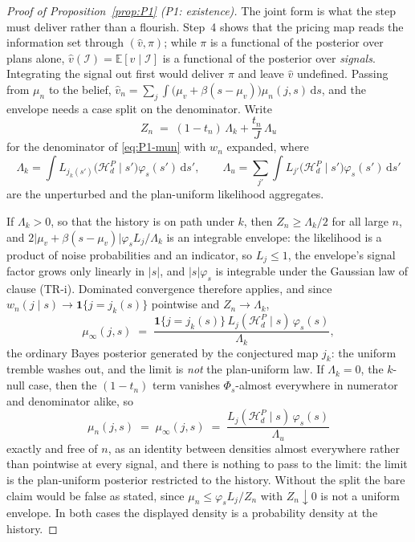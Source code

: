 \documentclass[11pt]{article}
\newcommand{\Eop}{\mathbb{E}}
\newcommand{\ind}{\mathbf{1}}
\begin{document}
\begin{proof}[Proof of Proposition~\ref{prop:P1} (P1: existence)]
The joint form is what the step must deliver rather than a flourish. Step~4 shows that the pricing
map reads the information set through $(\hat v,\pi)$; while $\pi$ is a functional of the posterior
over plans alone, $\hat v(\mathcal I) = \Eop[v \mid \mathcal I]$ is a functional of the posterior over
\emph{signals}. Integrating the signal out first would deliver $\pi$ and leave $\hat v$ undefined.
Passing from $\mu_n$ to the belief, $\hat v_n = \sum_j \int \bigl(\mu_v+\beta(s-\mu_v)\bigr)
\mu_n(j,s)\,\mathrm{d}s$, and the envelope needs a case split on the denominator. Write
\begin{equation}
\label{eq:P1-Zn}
Z_n \;=\; (1-t_n)\,\Lambda_k + \frac{t_n}{J}\,\Lambda_u
\end{equation}
for the denominator of \eqref{eq:P1-mun} with $w_n$ expanded, where
\[
\Lambda_k = \int L_{j_k(s')}\bigl(\mathcal H_d^P \mid s'\bigr)\varphi_s(s')\,\mathrm{d}s',
\qquad
\Lambda_u = \sum_{j'} \int L_{j'}\bigl(\mathcal H_d^P \mid s'\bigr)\varphi_s(s')\,\mathrm{d}s'
\]
are the unperturbed and the plan-uniform likelihood aggregates.

If $\Lambda_k > 0$, so that the history is on path under $k$, then $Z_n \ge \Lambda_k/2$ for all
large $n$, and $2\lvert \mu_v+\beta(s-\mu_v)\rvert\varphi_s L_j/\Lambda_k$ is an integrable envelope:
the likelihood is a product of noise probabilities and an indicator, so $L_j \le 1$, the envelope's
signal factor grows only linearly in $\lvert s\rvert$, and $\lvert s\rvert\varphi_s$ is integrable
under the Gaussian law of clause (TR-i). Dominated convergence therefore applies, and since
$w_n(j \mid s) \to \ind\{j = j_k(s)\}$ pointwise and $Z_n \to \Lambda_k$,
\[
\mu_\infty(j,s) \;=\; \frac{\ind\{j = j_k(s)\}\,L_j(\mathcal H_d^P \mid s)\,\varphi_s(s)}{\Lambda_k},
\]
the ordinary Bayes posterior generated by the conjectured map $j_k$: the uniform tremble washes out,
and the limit is \emph{not} the plan-uniform law. If $\Lambda_k = 0$, the $k$-null case, then the
$(1-t_n)$ term vanishes $\Phi_s$-almost everywhere in numerator and denominator alike, so
\[
\mu_n(j,s) \;=\; \mu_\infty(j,s) \;=\; \frac{L_j(\mathcal H_d^P \mid s)\,\varphi_s(s)}{\Lambda_u}
\]
exactly and free of $n$, as an identity between densities almost everywhere rather than pointwise at
every signal, and there is nothing to pass to the limit: the limit is the plan-uniform posterior
restricted to the history. Without the split the bare claim would be false as stated, since
$\mu_n \le \varphi_s L_j/Z_n$ with $Z_n \downarrow 0$ is not a uniform envelope. In both cases the
displayed density is a probability density at the history.


\end{proof}
\end{document}
